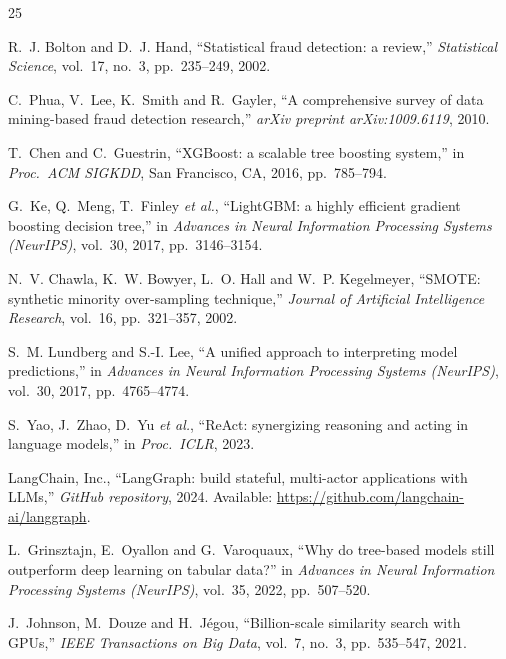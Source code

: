 \documentclass[12pt,a4paper]{article}
\begin{document}
\newpage
\begin{thebibliography}{25}

R.~J. Bolton and D.~J. Hand, ``Statistical fraud detection: a review,'' \textit{Statistical Science}, vol.~17, no.~3, pp.~235--249, 2002.

C.~Phua, V.~Lee, K.~Smith and R.~Gayler, ``A comprehensive survey of data mining-based fraud detection research,'' \textit{arXiv preprint arXiv:1009.6119}, 2010.

T.~Chen and C.~Guestrin, ``XGBoost: a scalable tree boosting system,'' in \textit{Proc.\ ACM SIGKDD}, San Francisco, CA, 2016, pp.~785--794.

G.~Ke, Q.~Meng, T.~Finley \textit{et al.}, ``LightGBM: a highly efficient gradient boosting decision tree,'' in \textit{Advances in Neural Information Processing Systems (NeurIPS)}, vol.~30, 2017, pp.~3146--3154.

N.~V. Chawla, K.~W. Bowyer, L.~O. Hall and W.~P. Kegelmeyer, ``SMOTE: synthetic minority over-sampling technique,'' \textit{Journal of Artificial Intelligence Research}, vol.~16, pp.~321--357, 2002.

S.~M. Lundberg and S.-I. Lee, ``A unified approach to interpreting model predictions,'' in \textit{Advances in Neural Information Processing Systems (NeurIPS)}, vol.~30, 2017, pp.~4765--4774.

S.~Yao, J.~Zhao, D.~Yu \textit{et al.}, ``ReAct: synergizing reasoning and acting in language models,'' in \textit{Proc.\ ICLR}, 2023.

LangChain, Inc., ``LangGraph: build stateful, multi-actor applications with LLMs,'' \textit{GitHub repository}, 2024. Available: \url{https://github.com/langchain-ai/langgraph}.

L.~Grinsztajn, E.~Oyallon and G.~Varoquaux, ``Why do tree-based models still outperform deep learning on tabular data?'' in \textit{Advances in Neural Information Processing Systems (NeurIPS)}, vol.~35, 2022, pp.~507--520.

J.~Johnson, M.~Douze and H.~J\'{e}gou, ``Billion-scale similarity search with GPUs,'' \textit{IEEE Transactions on Big Data}, vol.~7, no.~3, pp.~535--547, 2021.


\end{thebibliography}
\end{document}

